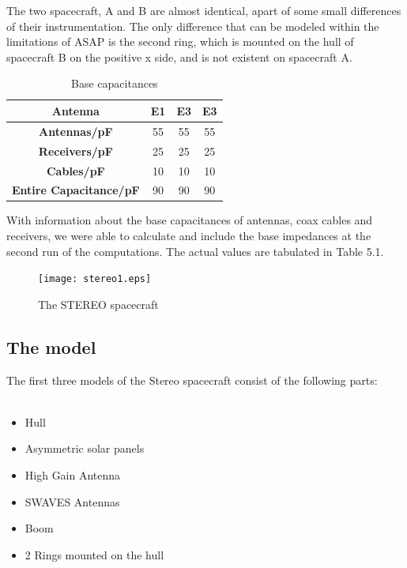 \documentclass[a4paper,14pt]{extbook}
\begin{document}
The two spacecraft, A and B are almost identical, apart of some small differences of their instrumentation. The only difference that can be modeled within the limitations of ASAP is the second ring, which is mounted on the hull of spacecraft B on the positive x side, and is not existent on spacecraft A.\\

\begin{table}[h]
\centering
\label{tab_base_caps55}
\caption{Base capacitances}
\begin{tabular}{|c|c|c|c|}
 \hline
\textbf{Antenna} & \textbf{E1} & \textbf{E3} & \textbf{E3} \\
\hline
\textbf{Antennas/pF} & 55 & 55 & 55 \\
\textbf{Receivers/pF}& 25 & 25 & 25 \\
\textbf{Cables/pF} & 10 & 10 & 10 \\
\hline
\textbf{Entire Capacitance/pF} & 90 & 90 & 90 \\
\hline\end{tabular}
\end{table}

With information about the base capacitances of antennas, coax cables and receivers, we were able to calculate and include the base impedances at the second run of the computations. The actual values are tabulated in Table 5.1. \\


\begin{figure}[h]
  \texttt{[image: stereo1.eps]}\\
  \caption{The STEREO spacecraft}\label{fig_stereo}
\end{figure}

\subsection{The model}
The first three models of the Stereo spacecraft consist of the following parts:\\
\\
\begin{itemize}
\item Hull
\item Asymmetric solar panels
\item High Gain Antenna
\item SWAVES Antennas
\item Boom
\item 2 Rings mounted on the hull
\end{itemize}
\end{document}
